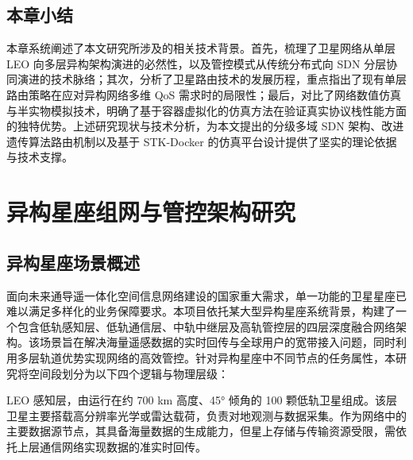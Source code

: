 \documentclass[print, master, vlined]{DissertUESTC}
\begin{document}
    
    \section{本章小结}
    本章系统阐述了本文研究所涉及的相关技术背景。首先，梳理了卫星网络从单层 LEO 向多层异构架构演进的必然性，以及管控模式从传统分布式向 SDN 分层协同演进的技术脉络；其次，分析了卫星路由技术的发展历程，重点指出了现有单层路由策略在应对异构网络多维 QoS 需求时的局限性；最后，对比了网络数值仿真与半实物模拟技术，明确了基于容器虚拟化的仿真方法在验证真实协议栈性能方面的独特优势。上述研究现状与技术分析，为本文提出的分级多域 SDN 架构、改进遗传算法路由机制以及基于 STK-Docker 的仿真平台设计提供了坚实的理论依据与技术支撑。

    \chapter{异构星座组网与管控架构研究}
    \label{chap: 异构星座组网与管控架构研究}

    \section{异构星座场景概述}
    面向未来通导遥一体化空间信息网络建设的国家重大需求，单一功能的卫星星座已难以满足多样化的业务保障要求。本项目依托某大型异构星座系统背景，构建了一个包含低轨感知层、低轨通信层、中轨中继层及高轨管控层的四层深度融合网络架构。该场景旨在解决海量遥感数据的实时回传与全球用户的宽带接入问题，同时利用多层轨道优势实现网络的高效管控。针对异构星座中不同节点的任务属性，本研究将空间段划分为以下四个逻辑与物理层级：
    
    LEO 感知层，由运行在约 700 km 高度、45° 倾角的 100 颗低轨卫星组成。该层卫星主要搭载高分辨率光学或雷达载荷，负责对地观测与数据采集。作为网络中的主要数据源节点，其具备海量数据的生成能力，但星上存储与传输资源受限，需依托上层通信网络实现数据的准实时回传。
    
\end{document}
